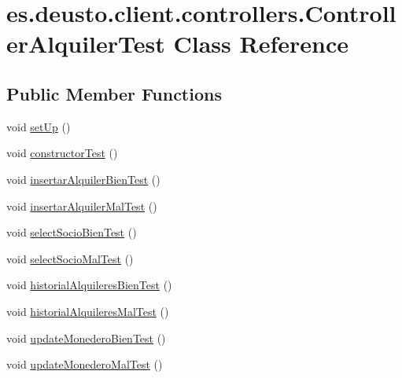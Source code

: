 \hypertarget{classes_1_1deusto_1_1client_1_1controllers_1_1_controller_alquiler_test}{}\section{es.\+deusto.\+client.\+controllers.\+Controller\+Alquiler\+Test Class Reference}
\label{classes_1_1deusto_1_1client_1_1controllers_1_1_controller_alquiler_test}
\subsection*{Public Member Functions}
\begin{DoxyCompactItemize}
\item 
void \mbox{\hyperlink{classes_1_1deusto_1_1client_1_1controllers_1_1_controller_alquiler_test_a4288832b4f9ee629ea9abecdc54c7395}{set\+Up}} ()
\item 
void \mbox{\hyperlink{classes_1_1deusto_1_1client_1_1controllers_1_1_controller_alquiler_test_acd88a7282b8412abf73b79be92ff244b}{constructor\+Test}} ()
\item 
void \mbox{\hyperlink{classes_1_1deusto_1_1client_1_1controllers_1_1_controller_alquiler_test_a1566bc76057bf81bd118445d1d92d918}{insertar\+Alquiler\+Bien\+Test}} ()
\item 
void \mbox{\hyperlink{classes_1_1deusto_1_1client_1_1controllers_1_1_controller_alquiler_test_af97ad5924a71ba58a8d047a2daadc4b0}{insertar\+Alquiler\+Mal\+Test}} ()
\item 
void \mbox{\hyperlink{classes_1_1deusto_1_1client_1_1controllers_1_1_controller_alquiler_test_a6d9d915ddb0ba857a802397f8215afe1}{select\+Socio\+Bien\+Test}} ()
\item 
void \mbox{\hyperlink{classes_1_1deusto_1_1client_1_1controllers_1_1_controller_alquiler_test_aa97a5c662008183bb72198eb6a828f81}{select\+Socio\+Mal\+Test}} ()
\item 
void \mbox{\hyperlink{classes_1_1deusto_1_1client_1_1controllers_1_1_controller_alquiler_test_a0922901cfe2b5ac6555b66f798600af5}{historial\+Alquileres\+Bien\+Test}} ()
\item 
void \mbox{\hyperlink{classes_1_1deusto_1_1client_1_1controllers_1_1_controller_alquiler_test_a1f72e56c098f4b9b20ea1b6f63537fd4}{historial\+Alquileres\+Mal\+Test}} ()
\item 
void \mbox{\hyperlink{classes_1_1deusto_1_1client_1_1controllers_1_1_controller_alquiler_test_a81394014c5b63f4935dbf83bf10ce780}{update\+Monedero\+Bien\+Test}} ()
\item 
void \mbox{\hyperlink{classes_1_1deusto_1_1client_1_1controllers_1_1_controller_alquiler_test_abe8dc527a8abb24f73d9ac32cfb4ffbf}{update\+Monedero\+Mal\+Test}} ()
\end{DoxyCompactItemize}


